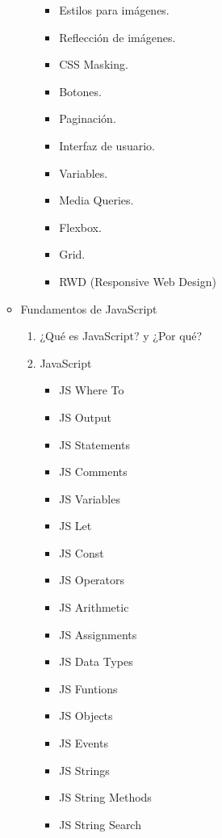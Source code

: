 \documentclass[12pt, letterpaper]{article}
\begin{document}
\begin{enumerate}
\begin{itemize}
\begin{enumerate}
\begin{itemize}
                \item Estilos para imágenes.
                \item Reflección de imágenes.
                \item CSS Masking.
                \item Botones.
                \item Paginación.
                \item Interfaz de usuario.
                \item Variables.
                \item Media Queries.
                \item Flexbox.
                \item Grid.
                \item RWD (Responsive Web Design)
            \end{itemize}
        \end{enumerate}
        \item Fundamentos de JavaScript
        \begin{enumerate}
            \item ¿Qué es JavaScript? y ¿Por qué?
            \item JavaScript
            \begin{itemize}
                \item JS Where To
                \item JS Output
                \item JS Statements
                \item JS Comments
                \item JS Variables
                \item JS Let
                \item JS Const
                \item JS Operators
                \item JS Arithmetic
                \item JS Assignments
                \item JS Data Types
                \item JS Funtions
                \item JS Objects
                \item JS Events
                \item JS Strings
                \item JS String Methods
                \item JS String Search

\end{itemize}
\end{enumerate}
\end{itemize}
\end{enumerate}
\end{document}
